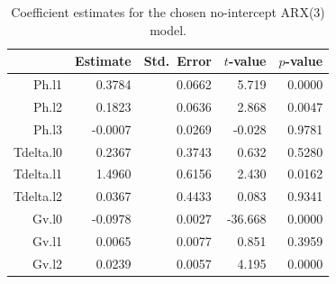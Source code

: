\begin{table}[ht]
\centering
\caption{Coefficient estimates for the chosen no-intercept ARX(3) model.} 
\label{tab:arx3_coef}
\begin{tabular}{rrrrr}
  \toprule
 & Estimate & Std.\ Error & $t$-value & $p$-value \\ 
  \midrule
Ph.l1 & 0.3784 & 0.0662 & 5.719 & 0.0000 \\ 
  Ph.l2 & 0.1823 & 0.0636 & 2.868 & 0.0047 \\ 
  Ph.l3 & -0.0007 & 0.0269 & -0.028 & 0.9781 \\ 
  Tdelta.l0 & 0.2367 & 0.3743 & 0.632 & 0.5280 \\ 
  Tdelta.l1 & 1.4960 & 0.6156 & 2.430 & 0.0162 \\ 
  Tdelta.l2 & 0.0367 & 0.4433 & 0.083 & 0.9341 \\ 
  Gv.l0 & -0.0978 & 0.0027 & -36.668 & 0.0000 \\ 
  Gv.l1 & 0.0065 & 0.0077 & 0.851 & 0.3959 \\ 
  Gv.l2 & 0.0239 & 0.0057 & 4.195 & 0.0000 \\ 
   \bottomrule
\end{tabular}
\end{table}
